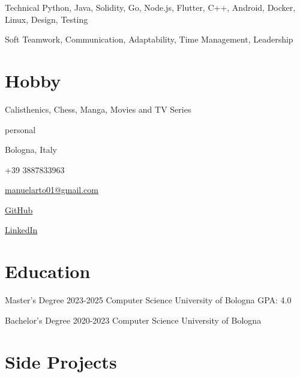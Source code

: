 \documentclass{tccv}
\begin{document}
\begin{factlist}

\item{Technical}
     {Python, Java, Solidity, Go, Node.js, Flutter, C++, Android, Docker, Linux, Design, Testing} \\

\item{Soft}
     {Teamwork, Communication, Adaptability, Time Management, Leadership}

\end{factlist}


\section{Hobby}

Calisthenics, Chess, Manga, Movies and TV Series


\newpage


\begin{keyvaluelist}{personal}
    \item[\faHome] Bologna, Italy
    \item[\faPhone] +39 3887833963
    \item[\faEnvelope] \href{mailto:manuelarto01@gmail.com}{manuelarto01@gmail.com}
    \item[\faGithub] \href{https://github.com/manuelarto}{GitHub}
    \item[\faLinkedin] \href{https://www.linkedin.com/in/manuel-arto-696012203/}{LinkedIn}
\end{keyvaluelist}


\section{Education}

\begin{yearlist}

\item[Master's Degree]{2023-2025}
     {Computer Science}
     {University of Bologna \newline GPA: 4.0}

\item[Bachelor's Degree]{2020-2023}
    {Computer Science}
    {University of Bologna}

\end{yearlist}


\section{Side Projects}
\end{document}
